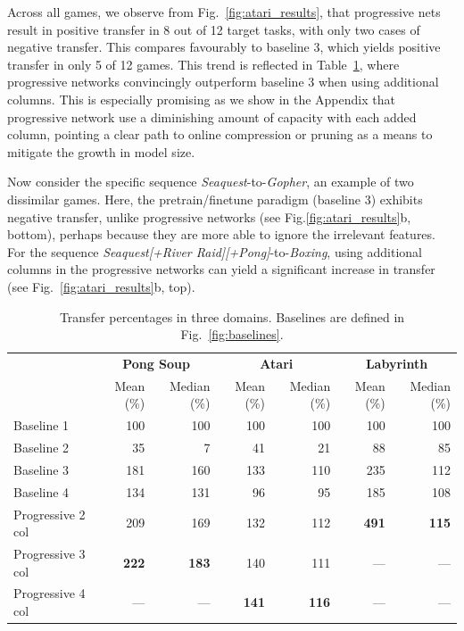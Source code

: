 Across all games, we observe from Fig.~\ref{fig:atari_results},
that progressive nets result in
positive transfer in 8 out of 12 target tasks, with only two cases
of negative transfer. This compares favourably to baseline 3, which yields
positive transfer in only 5 of 12 games. This trend is reflected in
Table~\ref{table:main}, where progressive networks convincingly outperform
baseline 3 when using additional columns. This is especially promising as
we show in the Appendix that progressive network use a diminishing amount of
capacity with each added column, pointing a clear path to online compression
or pruning as a means to mitigate the growth in model size.

Now consider the specific sequence
\textit{Seaquest}-to-\textit{Gopher}, an example of two dissimilar games. Here, the
pretrain/finetune paradigm (baseline 3) exhibits negative transfer, unlike
progressive networks (see Fig.\ref{fig:atari_results}b, bottom), perhaps
because they are more able to ignore the irrelevant features. For the sequence
\textit{Seaquest[+River Raid][+Pong]}-to-\textit{Boxing}, using additional
columns in the progressive networks can yield a significant increase in
transfer (see Fig.~\ref{fig:atari_results}b, top).

\begin{table}[t]
\begin{center}
\small
\begin{tabular}{@{}lrrrrrr@{}}
 \toprule
& \multicolumn{2}{c}{\textbf{Pong Soup}}
& \multicolumn{2}{c}{\textbf{Atari}}
& \multicolumn{2}{c}{\textbf{Labyrinth}}\\
                    & Mean (\%)    & Median (\%)  & Mean (\%)    & Median (\%)  & Mean (\%)     & Median (\%)  \\
 \midrule
  Baseline 1        & 100          & 100          & 100          & 100          & 100           & 100          \\
  Baseline 2        & 35           & 7            & 41           & 21           & 88            & 85           \\
  Baseline 3        & 181          & 160          & 133          & 110          & 235           & 112          \\
  Baseline 4        & 134          & 131          & 96           & 95           & 185           & 108          \\
  Progressive 2 col & 209          & 169          & 132          & 112          & \textbf{491}  & \textbf{115} \\
  Progressive 3 col & \textbf{222} & \textbf{183} & 140          & 111          & ---           & ---          \\
  Progressive 4 col & ---          & ---          & \textbf{141} & \textbf{116} & ---           & ---          \\

 \bottomrule
\end{tabular}
\end{center}
\caption{Transfer percentages in three domains. Baselines are defined in
    Fig.~\ref{fig:baselines}.}
\label{table:main}
\end{table}
